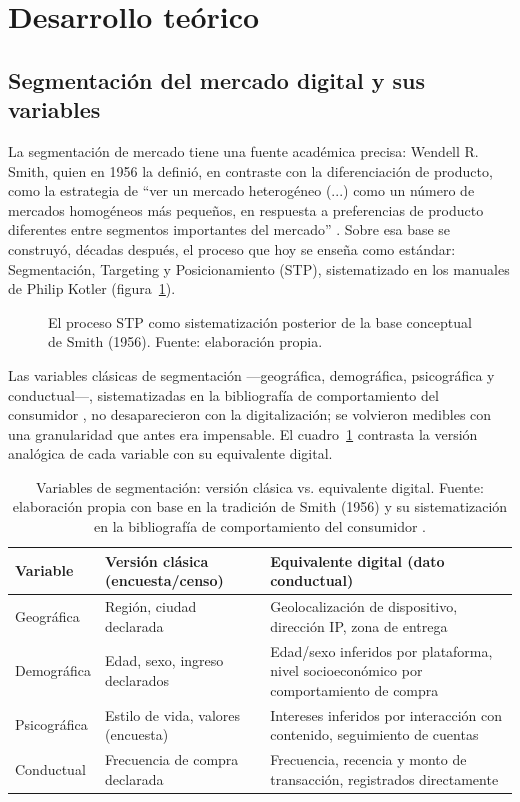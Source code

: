 \section{Desarrollo teórico}

\subsection{Segmentación del mercado digital y sus variables}

La segmentación de mercado tiene una fuente académica precisa: Wendell R.
Smith, quien en 1956 la definió, en contraste con la diferenciación de
producto, como la estrategia de \enquote{ver un mercado heterogéneo (...) como
un número de mercados homogéneos más pequeños, en respuesta a preferencias de
producto diferentes entre segmentos importantes del mercado}
\parencite{smith1956}. Sobre esa base se construyó, décadas después, el
proceso que hoy se enseña como estándar: Segmentación, Targeting y
Posicionamiento (STP), sistematizado en los manuales de Philip Kotler
\parencite{kotler2021marketing50}
(figura~\ref{fig:cap02-stp}).

\begin{figure}[htbp]
  \centering
  
  \caption{El proceso STP como sistematización posterior de la base
  conceptual de Smith (1956). Fuente: elaboración propia.}
  \label{fig:cap02-stp}
\end{figure}

Las variables clásicas de segmentación —geográfica, demográfica,
psicográfica y conductual—, sistematizadas en la bibliografía de
comportamiento del consumidor \parencite{hoyer2024consumer}, no
desaparecieron con la digitalización; se
volvieron medibles con una granularidad que antes era impensable. El
cuadro~\ref{tab:cap02-variables} contrasta la versión analógica de cada
variable con su equivalente digital.

\begin{table}[htbp]
\centering
\begin{tabular}{@{}p{2.6cm}p{4.6cm}p{5.4cm}@{}}
\toprule
Variable & Versión clásica (encuesta/censo) & Equivalente digital (dato conductual) \\
\midrule
Geográfica & Región, ciudad declarada & Geolocalización de dispositivo, dirección IP, zona de entrega \\
Demográfica & Edad, sexo, ingreso declarados & Edad/sexo inferidos por plataforma, nivel socioeconómico por comportamiento de compra \\
Psicográfica & Estilo de vida, valores (encuesta) & Intereses inferidos por interacción con contenido, seguimiento de cuentas \\
Conductual & Frecuencia de compra declarada & Frecuencia, recencia y monto de transacción, registrados directamente \\
\bottomrule
\end{tabular}
\caption{Variables de segmentación: versión clásica vs. equivalente digital.
Fuente: elaboración propia con base en la tradición de Smith (1956) y su
sistematización en la bibliografía de comportamiento del consumidor
\parencite{smith1956,solomon2017}.}
\label{tab:cap02-variables}
\end{table}

